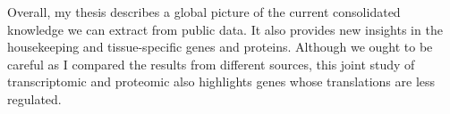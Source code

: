 \begin{singlespace}
{    Overall, my thesis describes a global picture of the current consolidated
    knowledge we can extract from public data. It also provides new insights
    in the housekeeping and tissue-specific genes and proteins. Although we
    ought to be careful as I compared the results from different sources,
    this joint study of transcriptomic and proteomic also highlights genes
    whose translations are less regulated.
    }
\end{singlespace}
